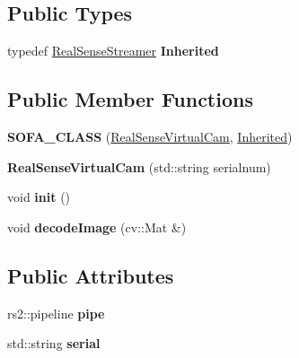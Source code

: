 \subsection*{Public Types}
\begin{DoxyCompactItemize}
\item 
\mbox{\label{classsofa_1_1rgbdtracking_1_1_real_sense_virtual_cam_aaf38bfd843842903f4b1e4457af3240f}} 
typedef \hyperlink{classsofa_1_1rgbdtracking_1_1_real_sense_streamer}{Real\+Sense\+Streamer} {\bfseries Inherited}
\end{DoxyCompactItemize}
\subsection*{Public Member Functions}
\begin{DoxyCompactItemize}
\item 
\mbox{\label{classsofa_1_1rgbdtracking_1_1_real_sense_virtual_cam_ac20d0286ccdd5caff30412db342814dc}} 
{\bfseries S\+O\+F\+A\+\_\+\+C\+L\+A\+SS} (\hyperlink{classsofa_1_1rgbdtracking_1_1_real_sense_virtual_cam}{Real\+Sense\+Virtual\+Cam}, \hyperlink{classsofa_1_1rgbdtracking_1_1_real_sense_streamer}{Inherited})
\item 
\mbox{\label{classsofa_1_1rgbdtracking_1_1_real_sense_virtual_cam_a673da2cd1e90f9448b458066e2f81eee}} 
{\bfseries Real\+Sense\+Virtual\+Cam} (std\+::string serialnum)
\item 
\mbox{\label{classsofa_1_1rgbdtracking_1_1_real_sense_virtual_cam_adc341623bbde6d3cc70f2cdc8a0263ef}} 
void {\bfseries init} ()
\item 
\mbox{\label{classsofa_1_1rgbdtracking_1_1_real_sense_virtual_cam_a09165a2c712fb5fd2f81f9fadaaedf7b}} 
void {\bfseries decode\+Image} (cv\+::\+Mat \&)
\end{DoxyCompactItemize}
\subsection*{Public Attributes}
\begin{DoxyCompactItemize}
\item 
\mbox{\label{classsofa_1_1rgbdtracking_1_1_real_sense_virtual_cam_aebfd00b71c1ce8a5505a602386dd3864}} 
rs2\+::pipeline {\bfseries pipe}
\item 
\mbox{\label{classsofa_1_1rgbdtracking_1_1_real_sense_virtual_cam_a45ccc29bedb1dd6f5357a0a3ecb8f8bb}} 
std\+::string {\bfseries serial}
\end{DoxyCompactItemize}
